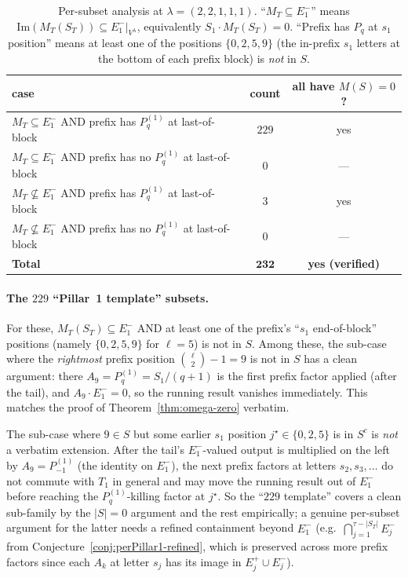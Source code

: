 \documentclass[11pt]{article}
\theoremstyle{definition}
\newcommand{\Vlam}{V^\lambda}
\newcommand{\Im}{\mathrm{Im}}
\newcommand{\Eplus}[1]{E^+_{#1}}
\newcommand{\Eminus}[1]{E^-_{#1}}
\begin{document}
\begin{table}[h]
\centering\renewcommand{\arraystretch}{1.2}
\caption{Per-subset analysis at $\lambda = (2,2,1,1,1)$. ``$M_T \subseteq \Eminus 1$''
means $\Im(M_T(S_T)) \subseteq \Eminus 1|_{\Vlam}$, equivalently
$S_1 \cdot M_T(S_T) = 0$. ``Prefix has $P_q$ at $s_1$ position'' means at least one of
the positions $\{0,2,5,9\}$ (the in-prefix $s_1$ letters at the bottom of each prefix
block) is \emph{not} in $S$.}
\begin{tabular}{lcc}
\toprule
case & count & all have $M(S)=0$? \\
\midrule
$M_T \subseteq \Eminus 1$ AND prefix has $P_q^{(1)}$ at last-of-block & $229$ & yes \\
$M_T \subseteq \Eminus 1$ AND prefix has no $P_q^{(1)}$ at last-of-block & $0$ & --- \\
$M_T \not\subseteq \Eminus 1$ AND prefix has $P_q^{(1)}$ at last-of-block & $3$ & yes \\
$M_T \not\subseteq \Eminus 1$ AND prefix has no $P_q^{(1)}$ at last-of-block & $0$ & --- \\
\midrule
\textbf{Total} & $\mathbf{232}$ & \textbf{yes (verified)} \\
\bottomrule
\end{tabular}
\end{table}

\paragraph{The $229$ ``Pillar~1 template'' subsets.}
For these, $M_T(S_T) \subseteq \Eminus 1$ AND at least one of the prefix's
``$s_1$ end-of-block'' positions (namely $\{0, 2, 5, 9\}$ for $\ell = 5$)
is not in $S$. Among these, the sub-case where the \emph{rightmost} prefix
position $\binom{\ell}{2}-1 = 9$ is not in $S$ has a clean argument: there
$A_9 = P_q^{(1)} = S_1/(q+1)$ is the first prefix factor applied (after the
tail), and $A_9 \cdot E_1^- = 0$, so the running result vanishes
immediately. This matches the proof of Theorem~\ref{thm:omega-zero}
verbatim.

The sub-case where $9 \in S$ but some earlier $s_1$ position $j^\star
\in \{0,2,5\}$ is in $S^c$ is \emph{not} a verbatim extension. After the
tail's $E^-_1$-valued output is multiplied on the left by
$A_9 = P_{-1}^{(1)}$ (the identity on $E^-_1$), the next prefix factors at
letters $s_2, s_3, \ldots$ do not commute with $T_1$ in general and may
move the running result out of $E^-_1$ before reaching the
$P_q^{(1)}$-killing factor at $j^\star$. So the ``$229$ template'' covers
a clean sub-family by the $|S|=0$ argument and the rest empirically; a
genuine per-subset argument for the latter needs a refined containment
beyond $\Eminus 1$ (e.g.\ $\bigcap_{j=1}^{\tau-|S_T|} \Eminus j$ from
Conjecture~\ref{conj:perPillar1-refined}, which is preserved across more
prefix factors since each $A_k$ at letter $s_j$ has its image in
$\Eplus j \cup \Eminus j$).
\end{document}
